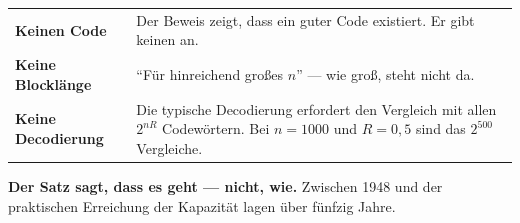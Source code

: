 \begin{warnung}
\begin{center}
{\small
\renewcommand{\arraystretch}{1.52}
\begin{tabular}{@{}P{2.4cm}P{6.2cm}@{}}
\toprule
\textbf{Keinen Code} & Der Beweis zeigt, dass ein guter Code existiert. Er gibt keinen an.\\
\textbf{Keine Blocklänge} & \enquote{Für hinreichend großes $n$} --- wie groß, steht nicht da.\\
\textbf{Keine Decodierung} & Die typische Decodierung erfordert den Vergleich mit allen $2^{nR}$ Codewörtern. Bei $n=1000$ und $R=0{,}5$ sind das $2^{500}$ Vergleiche.\\
\bottomrule
\end{tabular}}
\end{center}

\begin{center}
\begin{minipage}{0.9\textwidth}
\textbf{Der Satz sagt, dass es geht --- nicht, wie.} Zwischen 1948 und der praktischen Erreichung der Kapazität lagen über fünfzig Jahre.
\end{minipage}
\end{center}

\begin{center}
\begin{minipage}{0.88\textwidth}
\end{minipage}
\end{center}
\end{warnung}

